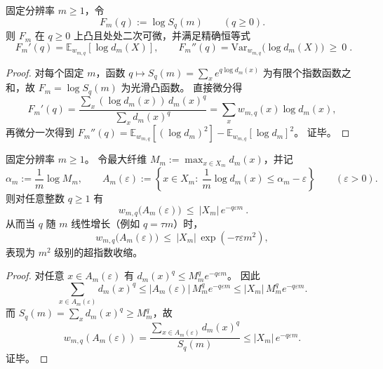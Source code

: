 \begin{proposition}\label{prop:pom-escort-derivative-identities}
固定分辨率 \(m\ge 1\)，令
\[
F_m(q):=\log S_q(m)\qquad(q\ge 0).
\]
则 \(F_m\) 在 \(q\ge 0\) 上凸且处处二次可微，并满足精确恒等式
\[
\boxed{\;
F_m'(q)=\mathbb{E}_{w_{m,q}}[\log d_m(X)],\qquad
F_m''(q)=\mathrm{Var}_{w_{m,q}}\!\bigl(\log d_m(X)\bigr)\ \ge\ 0\; }.
\]
\end{proposition}
\begin{proof}
对每个固定 \(m\)，函数 \(q\mapsto S_q(m)=\sum_x e^{q\log d_m(x)}\) 为有限个指数函数之和，故 \(F_m=\log S_q(m)\) 为光滑凸函数。
直接微分得
\[
F_m'(q)=\frac{\sum_x (\log d_m(x))\,d_m(x)^q}{\sum_x d_m(x)^q}
=\sum_x w_{m,q}(x)\log d_m(x),
\]
再微分一次得到
\(
F_m''(q)=\mathbb{E}_{w_{m,q}}[(\log d_m)^2]-\mathbb{E}_{w_{m,q}}[\log d_m]^2
\)。
证毕。
\end{proof}

\begin{corollary}\label{cor:pom-escort-zero-temperature-superexp-concentration}
固定分辨率 \(m\ge 1\)。
令最大纤维
\(
M_m:=\max_{x\in X_m} d_m(x)
\)，并记
\[
\alpha_m:=\frac1m\log M_m,\qquad
A_m(\varepsilon):=\left\{x\in X_m:\ \frac1m\log d_m(x)\le \alpha_m-\varepsilon\right\}\qquad(\varepsilon>0).
\]
则对任意整数 \(q\ge 1\) 有
\[
\boxed{\ w_{m,q}\bigl(A_m(\varepsilon)\bigr)\ \le\ |X_m|\,e^{-q\varepsilon m}\ }.
\]
从而当 \(q\) 随 \(m\) 线性增长（例如 \(q=\tau m\)）时，
\[
w_{m,q}\bigl(A_m(\varepsilon)\bigr)\ \le\ |X_m|\,\exp(-\tau\varepsilon m^2),
\]
表现为 \(m^2\) 级别的超指数收缩。
\end{corollary}
\begin{proof}
对任意 \(x\in A_m(\varepsilon)\) 有 \(d_m(x)^q\le M_m^q e^{-q\varepsilon m}\)。
因此
\[
\sum_{x\in A_m(\varepsilon)} d_m(x)^q \le |A_m(\varepsilon)|\,M_m^q e^{-q\varepsilon m}\le |X_m|\,M_m^q e^{-q\varepsilon m}.
\]
而 \(S_q(m)=\sum_x d_m(x)^q\ge M_m^q\)，故
\[
w_{m,q}(A_m(\varepsilon))
=\frac{\sum_{x\in A_m(\varepsilon)} d_m(x)^q}{S_q(m)}
\le |X_m|\,e^{-q\varepsilon m}.
\]
证毕。
\end{proof}





